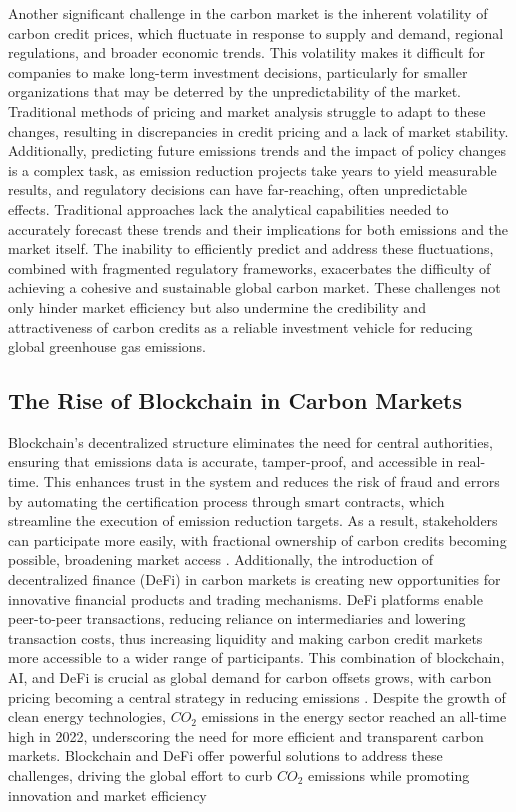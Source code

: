 \documentclass[preprint,12pt]{elsarticle}
\begin{document}
Another significant challenge in the carbon market is the inherent volatility of carbon credit prices, which fluctuate in response to supply and demand, regional regulations, and broader economic trends. This volatility makes it difficult for companies to make long-term investment decisions, particularly for smaller organizations that may be deterred by the unpredictability of the market. Traditional methods of pricing and market analysis struggle to adapt to these changes, resulting in discrepancies in credit pricing and a lack of market stability. Additionally, predicting future emissions trends and the impact of policy changes is a complex task, as emission reduction projects take years to yield measurable results, and regulatory decisions can have far-reaching, often unpredictable effects. Traditional approaches lack the analytical capabilities needed to accurately forecast these trends and their implications for both emissions and the market itself. The inability to efficiently predict and address these fluctuations, combined with fragmented regulatory frameworks, exacerbates the difficulty of achieving a cohesive and sustainable global carbon market\citep{boumaiza2024leveraging}. These challenges not only hinder market efficiency but also undermine the credibility and attractiveness of carbon credits as a reliable investment vehicle for reducing global greenhouse gas emissions.

\subsection{The Rise of Blockchain in Carbon Markets}
Blockchain’s decentralized structure eliminates the need for central authorities, ensuring that emissions data is accurate, tamper-proof, and accessible in real-time. This enhances trust in the system and reduces the risk of fraud and errors by automating the certification process through smart contracts, which streamline the execution of emission reduction targets. As a result, stakeholders can participate more easily, with fractional ownership of carbon credits becoming possible, broadening market access \citep{enejison2022blocks}. Additionally, the introduction of decentralized finance (DeFi) in carbon markets is creating new opportunities for innovative financial products and trading mechanisms. DeFi platforms enable peer-to-peer transactions, reducing reliance on intermediaries and lowering transaction costs, thus increasing liquidity and making carbon credit markets more accessible to a wider range of participants. This combination of blockchain, AI, and DeFi is crucial as global demand for carbon offsets grows, with carbon pricing becoming a central strategy in reducing emissions . Despite the growth of clean energy technologies, $CO_2$ emissions in the energy sector reached an all-time high in 2022, underscoring the need for more efficient and transparent carbon markets. Blockchain and DeFi offer powerful solutions to address these challenges, driving the global effort to curb $CO_2$ emissions while promoting innovation and market efficiency 
\end{document}

